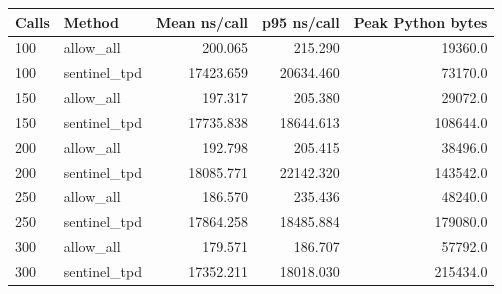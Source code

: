 \begin{tabular}{llrrr}
Calls & Method & Mean ns/call & p95 ns/call & Peak Python bytes \\
\hline
100 & allow\_all & 200.065 & 215.290 & 19360.0 \\
100 & sentinel\_tpd & 17423.659 & 20634.460 & 73170.0 \\
150 & allow\_all & 197.317 & 205.380 & 29072.0 \\
150 & sentinel\_tpd & 17735.838 & 18644.613 & 108644.0 \\
200 & allow\_all & 192.798 & 205.415 & 38496.0 \\
200 & sentinel\_tpd & 18085.771 & 22142.320 & 143542.0 \\
250 & allow\_all & 186.570 & 235.436 & 48240.0 \\
250 & sentinel\_tpd & 17864.258 & 18485.884 & 179080.0 \\
300 & allow\_all & 179.571 & 186.707 & 57792.0 \\
300 & sentinel\_tpd & 17352.211 & 18018.030 & 215434.0 \\
\end{tabular}
